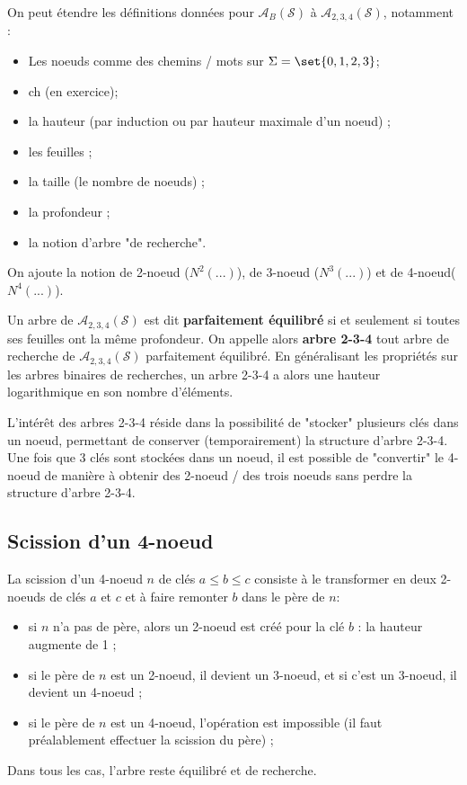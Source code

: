 \documentclass{scrartcl}
\begin{document}
			On peut étendre les définitions données pour $\mathscr{A}_B(\mathcal{S})$ à $\mathscr{A}_{2,3,4}(\mathcal{S})$, notamment : 
			\begin{multicols}{2}
			\begin{itemize}
				\item Les noeuds comme des chemins / mots sur $\Sigma = \set{0,1,2,3}$;
				\item ch (en exercice);
				\item la hauteur (par induction ou par hauteur maximale d'un noeud) ;
				\item les feuilles ;
				\item la taille (le nombre de noeuds) ;
				\item la profondeur ;
				\item la notion d'arbre "de recherche".
			\end{itemize}
			\end{multicols}

			On ajoute la notion de 2-noeud ($N^2(...)$), de 3-noeud ($N^3(...)$) et de 4-noeud($N^4(...)$).

			Un arbre de $\mathscr{A}_{2,3,4}(\mathcal{S})$ est dit \textbf{parfaitement équilibré} si et seulement si toutes ses feuilles ont la même profondeur.
			On appelle alors \textbf{arbre 2-3-4} tout arbre de recherche de $\mathscr{A}_{2,3,4}(\mathcal{S})$ parfaitement équilibré.
			En généralisant les propriétés sur les arbres binaires de recherches, un arbre 2-3-4 a alors une hauteur logarithmique en son nombre d'éléments.

			L'intérêt des arbres 2-3-4 réside dans la possibilité de "stocker" plusieurs clés dans un noeud, permettant de conserver (temporairement) la structure d'arbre 2-3-4. 
			Une fois que 3 clés sont stockées dans un noeud, il est possible de "convertir" le 4-noeud de manière à obtenir des 2-noeud / des trois noeuds sans perdre la structure d'arbre 2-3-4.
		\subsection{Scission d'un 4-noeud}
			La scission d'un 4-noeud $n$ de clés $a \leq b \leq c$ consiste à le transformer en deux 2-noeuds de clés $a$ et $c$ et à faire remonter $b$ dans le père de $n$:
			\begin{itemize}
				\item si $n$ n'a pas de père, alors un 2-noeud est créé pour la clé $b$ : la hauteur augmente de 1 ; 
				\item si le père de $n$ est un 2-noeud, il devient un 3-noeud, et si c'est un 3-noeud, il devient un 4-noeud ;
				\item si le père de $n$ est un 4-noeud, l'opération est impossible (il faut préalablement effectuer la scission du père) ;
			\end{itemize}
			Dans tous les cas, l'arbre reste équilibré et de recherche.
\end{document}
